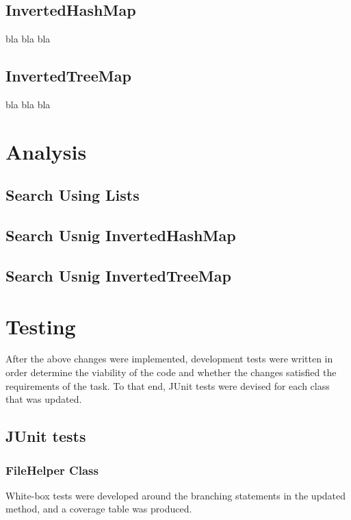 \subsection{InvertedHashMap}
bla bla bla \cite{oracle:hashmap}
\subsection{InvertedTreeMap}
bla bla bla

\section{Analysis} 
\subsection{Search Using Lists}
\subsection{Search Usnig InvertedHashMap}
\subsection{Search Usnig InvertedTreeMap}


\section{Testing}
After the above changes were implemented, development tests were written in order determine the viability of the code and whether the changes satisfied the requirements of the task. To that end, JUnit tests were devised for each class that was updated.

\subsection{JUnit tests}

\subsubsection{FileHelper Class}

White-box tests were developed around the branching statements in the updated method, and a coverage table was produced.

